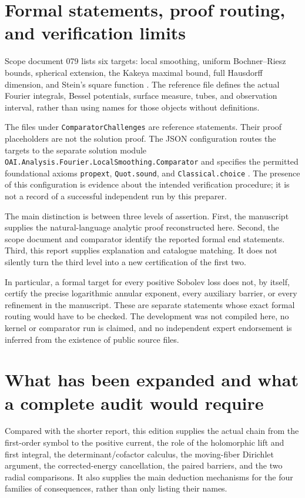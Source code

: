 \documentclass[11pt,a4paper]{article}
\numberwithin{equation}{section}
\theoremstyle{definition}
\theoremstyle{remark}
\begin{document}
\section{Formal statements, proof routing, and verification limits}
\label{sec:formal}
Scope document 079 lists six targets: local smoothing, uniform Bochner--Riesz
bounds, spherical extension, the Kakeya maximal bound, full Hausdorff dimension,
and Stein's square function \cite{scope}. The reference file defines the actual
Fourier integrals, Bessel potentials, surface measure, tubes, and observation
interval, rather than using names for those objects without definitions.

The files under \texttt{ComparatorChallenges} are reference statements. Their
proof placeholders are not the solution proof. The JSON configuration routes
the targets to the separate solution module
\texttt{OAI.Analysis.Fourier.LocalSmoothing.Comparator} and specifies the
permitted foundational axioms \texttt{propext}, \texttt{Quot.sound}, and
\texttt{Classical.choice} \cite{challenge,config,solution}.
The presence of this configuration is evidence about the intended verification
procedure; it is not a record of a successful independent run by this preparer.

The main distinction is between three levels of assertion. First, the
manuscript supplies the natural-language analytic proof reconstructed here.
Second, the scope document and comparator identify the reported formal end
statements. Third, this report supplies explanation and catalogue matching.
It does not silently turn the third level into a new certification of the
first two.

In particular, a formal target for every positive Sobolev loss does not, by
itself, certify the precise logarithmic annular exponent, every auxiliary
barrier, or every refinement in the manuscript. These are separate statements
whose exact formal routing would have to be checked. The development was not
compiled here, no kernel or comparator run is claimed, and no independent
expert endorsement is inferred from the existence of public source files.

\section{What has been expanded and what a complete audit would require}
\label{sec:audit}
Compared with the shorter report, this edition supplies the actual chain from
the first-order symbol to the positive current, the role of the holomorphic
lift and first integral, the determinant/cofactor calculus, the moving-fiber
Dirichlet argument, the corrected-energy cancellation, the paired barriers,
and the two radial comparisons. It also supplies the main deduction mechanisms
for the four families of consequences, rather than only listing their names.
\end{document}

